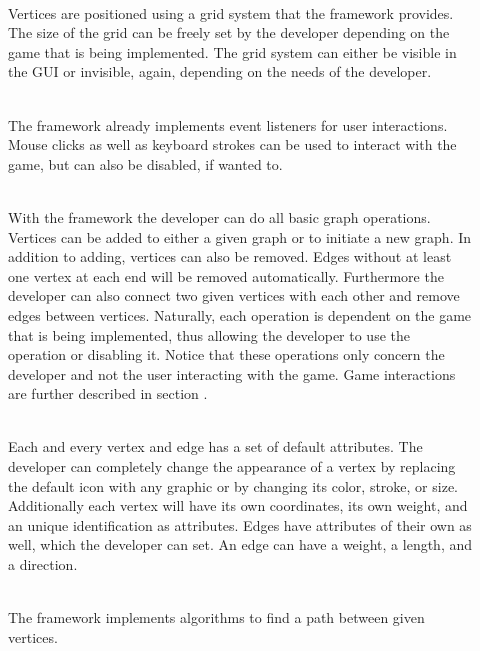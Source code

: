 \begin{description}
	\item[] \textbf{} \\
	Vertices are positioned using a grid system that the \gls{framework} provides. The size of the grid can be freely set by the developer depending on the game that is being implemented. The grid system can either be visible in the \gls{GUI} or invisible, again, depending on the needs of the developer.
	\item[] \textbf{} \\
	The framework already implements event listeners for user interactions. Mouse clicks as well as keyboard strokes can be used to interact with the game, but can also be disabled, if wanted to.
  	\item[] \textbf{} \\
	With the framework the developer can do all basic graph operations. Vertices can be added to either a given graph or to initiate a new graph. In addition to adding, vertices can also be removed. Edges without at least one vertex at each end will be removed automatically. Furthermore the developer can also connect two given vertices with each other and remove edges between vertices. Naturally, each operation is dependent on the game that is being implemented, thus allowing the developer to use the operation or disabling it. Notice that these operations only concern the developer and not the user interacting with the game. Game interactions are further described in section .
	\item[] \textbf{} \\
	Each and every vertex and edge has a set of default attributes. The developer can completely change the appearance of a vertex by replacing the default icon with any graphic or by changing its color, stroke, or size. Additionally each vertex will have its own coordinates, its own weight, and an unique identification as attributes. Edges have attributes of their own as well, which the developer can set. An edge can have a weight, a length, and a direction.
	\item[] \textbf{} \\
	The framework implements algorithms to find a path between given vertices.

\end{description}
